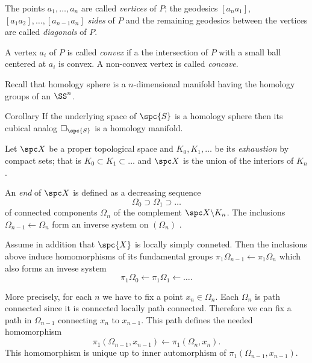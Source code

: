 The points $a_1,\dots,a_n$ 
are called \emph{vertices} of $P$;
the geodesics $[a_na_1]$, $[a_1a_2],\dots,[a_{n-1}a_n]$ 
\emph{sides} of $P$
and the remaining geodesics between the vertices are called \emph{diagonals} of $P$.

A vertex $a_i$ of $P$ 
is called \emph{convex} if a the intersection of $P$ with a small ball centered at $a_i$ is convex.
A non-convex vertex is called \emph{concave}.















Recall that homology sphere is a $n$-dimensional manifold having the homology groups of an $\SS^n$. 

\begin{thm}{Corollary}\label{cor:flag-hom}
If the underlying space of $\spc{S}$ 
is a homology sphere then its cubical analog $\square_{\spc{S}}$ is a homology manifold.
\end{thm}














Let $\spc X$ be a proper topological space
and $K_0, K_1, \dots$
be its \emph{exhaustion} by compact sets;
that is $K_0\subset K_1\subset \dots$ and $\spc X$ is the union of the interiors of $K_n$.

An \emph{end} of $\spc X$
is defined as a decreasing sequence 
\[\Omega_0\supset \Omega_1\supset \dots\]
of connected components $\Omega_n$ 
of the complement 
$\spc X\backslash K_n$.
The inclusions 
$\Omega_{n-1}\leftarrow \Omega_{n}$
form an inverse system on $(\Omega_n)$ .

Assume in addition that $\spc{X}$
is locally simply conneted.
Then the inclusions above induce 
homomorphisms of its fundamental groups 
$\pi_1\Omega_{n-1}\leftarrow\pi_1\Omega_n$ 
which also forms an invese system
\[\pi_1\Omega_0\leftarrow \pi_1\Omega_1\leftarrow\dots.\]

More precisely, for each $n$ we have to fix a point $x_n\in \Omega_n$.
Each $\Omega_n$ is path connected 
since it is connected locally path connected.
Therefore we can fix a path in $\Omega_{n-1}$
connecting $x_{n}$ to $x_{n-1}$.
This path defines the needed homomorphism 
\[\pi_1(\Omega_{n-1},x_{n-1})\leftarrow\pi_1(\Omega_n,x_n).\]
This homomorphism is unique up to inner automorphism of $\pi_1(\Omega_{n-1},x_{n-1})$.

